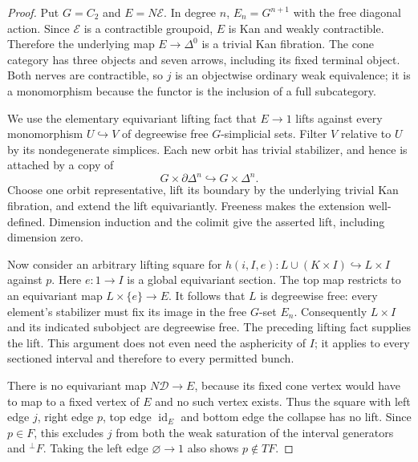 \begin{proof}
Put $G=C_2$ and $E=N\mathcal E$.  In degree $n$,
$E_n=G^{n+1}$ with the free diagonal action.  Since $\mathcal E$ is
a contractible groupoid, $E$ is Kan and weakly contractible.  Therefore
the underlying map $E\to\Delta^0$ is a trivial Kan fibration.
The cone category has three objects and seven arrows, including its
fixed terminal object.  Both nerves are contractible, so $j$ is an
objectwise ordinary weak equivalence; it is a monomorphism because
the functor is the inclusion of a full subcategory.

We use the elementary equivariant lifting fact that $E\to1$ lifts
against every monomorphism $U\hookrightarrow V$ of degreewise free
$G$-simplicial sets.  Filter $V$ relative to $U$ by its nondegenerate
simplices.  Each new orbit has trivial stabilizer, and hence is
attached by a copy of
\[
 G\times\partial\Delta^n\hookrightarrow G\times\Delta^n.
\]
Choose one orbit representative, lift its boundary by the underlying
trivial Kan fibration, and extend the lift equivariantly.  Freeness
makes the extension well-defined.  Dimension induction and the
colimit give the asserted lift, including dimension zero.

Now consider an arbitrary lifting square for
$h(i,I,e):L\cup(K\times I)\hookrightarrow L\times I$
against $p$.  Here $e:1\to I$ is a global equivariant section.
The top map restricts to an equivariant map $L\times\{e\}\to E$.
It follows that $L$ is degreewise free: every element's stabilizer
must fix its image in the free $G$-set $E_n$.  Consequently
$L\times I$ and its indicated subobject are degreewise free.
The preceding lifting fact supplies the lift.  This argument does
not even need the asphericity of $I$; it applies to every sectioned
interval and therefore to every permitted bunch.

There is no equivariant map $N\mathcal D\to E$, because its fixed
cone vertex would have to map to a fixed vertex of $E$ and no such
vertex exists.  Thus the square with left edge $j$, right edge $p$,
top edge $\operatorname{id}_E$ and bottom edge the collapse has no
lift.  Since $p\in F$, this excludes $j$ from both the weak saturation
of the interval generators and ${}^{\perp}F$.  Taking the left edge
$\varnothing\to1$ also shows $p\notin TF$.


\end{proof}
